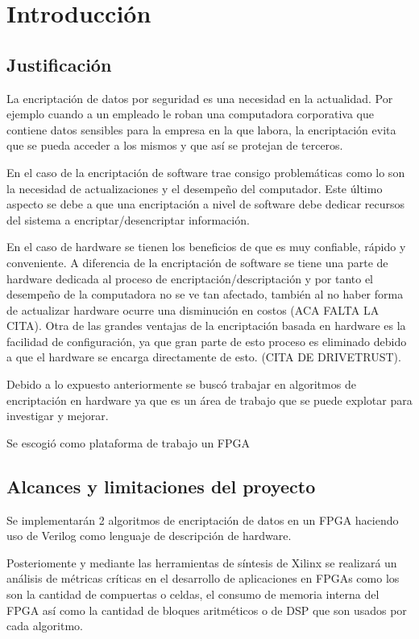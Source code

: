 \chapter{Introducción}

\section{Justificación}
La encriptación de datos por seguridad es una necesidad en la actualidad. Por ejemplo cuando a un empleado le roban una computadora corporativa que contiene datos sensibles para la empresa en la que labora, la encriptación evita que se pueda acceder a los mismos y que así se protejan de terceros.

En el caso de la encriptación de software trae consigo problemáticas como lo son la necesidad de actualizaciones y el desempeño del computador. Este último aspecto se debe a que una encriptación a nivel de software debe dedicar recursos del sistema a encriptar/desencriptar información. 

En el caso de hardware se tienen los beneficios de que es muy confiable, rápido y conveniente. A diferencia de la encriptación de software se tiene una parte de hardware dedicada al proceso de encriptación/descriptación y por tanto el desempeño de la computadora no se ve tan afectado, también al no haber forma de actualizar hardware ocurre una disminución en costos (ACA FALTA LA CITA). Otra de las grandes ventajas de la encriptación basada en hardware es la facilidad de configuración, ya que gran parte de esto proceso es eliminado debido a que el hardware se encarga directamente de esto. (CITA DE DRIVETRUST).

Debido a lo expuesto anteriormente se buscó trabajar en algoritmos de encriptación en hardware ya que es un área de trabajo que se puede explotar para investigar y mejorar.

Se escogió como plataforma de trabajo un FPGA 


\section{Alcances y limitaciones del proyecto}
Se implementarán 2 algoritmos de encriptación de datos en un FPGA haciendo uso de Verilog como lenguaje de descripción de hardware. 

Posteriomente y mediante las herramientas de síntesis de Xilinx se realizará un análisis de métricas críticas en el desarrollo de aplicaciones en FPGAs como los son la cantidad de compuertas o celdas, el consumo de memoria interna del FPGA así como la cantidad de bloques aritméticos o de DSP que son usados por cada algoritmo. 


